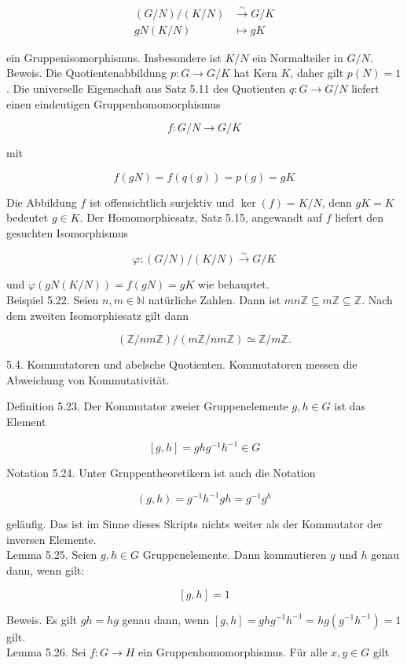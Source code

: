 \documentclass[10pt, letterpaper]{article}
\begin{document}
$$
\begin{aligned}
(G / N) /(K / N) & \xrightarrow{\sim} G / K \\
g N(K / N) & \mapsto g K
\end{aligned}
$$

ein Gruppenisomorphismus. Insbesondere ist $K / N$ ein Normalteiler in $G / N$.\\
Beweis. Die Quotientenabbildung $p: G \rightarrow G / K$ hat Kern $K$, daher gilt $p(N)=1$. Die universelle Eigenschaft aus Satz 5.11 des Quotienten $q: G \rightarrow G / N$ liefert einen eindeutigen Gruppenhomomorphismus

$$
f: G / N \rightarrow G / K
$$

mit

$$
f(g N)=f(q(g))=p(g)=g K
$$

Die Abbildung $f$ ist offensichtlich surjektiv und $\operatorname{ker}(f)=K / N$, denn $g K=K$ bedeutet $g \in K$. Der Homomorphiesatz, Satz 5.15, angewandt auf $f$ liefert den gesuchten Isomorphismus

$$
\varphi:(G / N) /(K / N) \xrightarrow{\sim} G / K
$$

und $\varphi(g N(K / N))=f(g N)=g K$ wie behauptet.\\
Beispiel 5.22. Seien $n, m \in \mathbb{N}$ natürliche Zahlen. Dann ist $m n \mathbb{Z} \subseteq m \mathbb{Z} \subseteq \mathbb{Z}$. Nach dem zweiten Isomorphiesatz gilt dann

$$
(\mathbb{Z} / n m \mathbb{Z}) /(m \mathbb{Z} / n m \mathbb{Z}) \simeq \mathbb{Z} / m \mathbb{Z} .
$$

5.4. Kommutatoren und abelsche Quotienten. Kommutatoren messen die Abweichung von Kommutativität.

Definition 5.23. Der Kommutator zweier Gruppenelemente $g, h \in G$ ist das Element

$$
[g, h]=g h g^{-1} h^{-1} \in G
$$

Notation 5.24. Unter Gruppentheoretikern ist auch die Notation

$$
(g, h)=g^{-1} h^{-1} g h=g^{-1} g^{h}
$$

geläufig. Das ist im Sinne dieses Skripts nichts weiter als der Kommutator der inversen Elemente.\\
Lemma 5.25. Seien $g, h \in G$ Gruppenelemente. Dann kommutieren $g$ und $h$ genau dann, wenn gilt:

$$
[g, h]=1
$$

Beweis. Es gilt $g h=h g$ genau dann, wenn $[g, h]=g h g^{-1} h^{-1}=h g\left(g^{-1} h^{-1}\right)=1$ gilt.\\
Lemma 5.26. Sei $f: G \rightarrow H$ ein Gruppenhomomorphismus. Für alle $x, y \in G$ gilt
\end{document}
